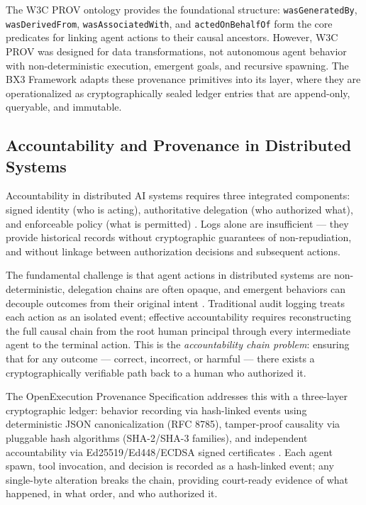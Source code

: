 The W3C PROV ontology provides the foundational structure: \texttt{wasGeneratedBy}, \texttt{wasDerivedFrom}, \texttt{wasAssociatedWith}, and \texttt{actedOnBehalfOf} form the core predicates for linking agent actions to their causal ancestors. However, W3C PROV was designed for data transformations, not autonomous agent behavior with non-deterministic execution, emergent goals, and recursive spawning. The BX3 Framework adapts these provenance primitives into its \fact{} layer, where they are operationalized as cryptographically sealed ledger entries that are append-only, queryable, and immutable.

\subsection{Accountability and Provenance in Distributed Systems}
\label{sec:accountability-provenance}

Accountability in distributed AI systems requires three integrated components: signed identity (who is acting), authoritative delegation (who authorized what), and enforceable policy (what is permitted) \cite{zylos2026}. Logs alone are insufficient — they provide historical records without cryptographic guarantees of non-repudiation, and without linkage between authorization decisions and subsequent actions.

The fundamental challenge is that agent actions in distributed systems are non-deterministic, delegation chains are often opaque, and emergent behaviors can decouple outcomes from their original intent \cite{zylos2026}. Traditional audit logging treats each action as an isolated event; effective accountability requires reconstructing the full causal chain from the root human principal through every intermediate agent to the terminal action. This is the \emph{accountability chain problem}: ensuring that for any outcome — correct, incorrect, or harmful — there exists a cryptographically verifiable path back to a human who authorized it.

The OpenExecution Provenance Specification addresses this with a three-layer cryptographic ledger: behavior recording via hash-linked events using deterministic JSON canonicalization (RFC 8785), tamper-proof causality via pluggable hash algorithms (SHA-2/SHA-3 families), and independent accountability via Ed25519/Ed448/ECDSA signed certificates \cite{openexecution2025}. Each agent spawn, tool invocation, and decision is recorded as a hash-linked event; any single-byte alteration breaks the chain, providing court-ready evidence of what happened, in what order, and who authorized it.

